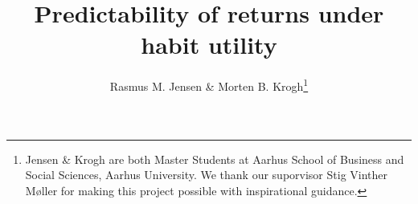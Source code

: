 

\usepackage{booktabs}



\onehalfspacing      %

\author{Rasmus M. Jensen \& Morten B. Krogh\thanks{\rm Jensen \& Krogh are both Master Students at Aarhus School of Business and Social Sciences, Aarhus University. We thank our suporvisor Stig Vinther Møller for making this project possible with inspirational guidance.}}

\title{\Large \bf Predictability of returns under habit utility}

\date{}              %


\maketitle
\thispagestyle{empty}



\clearpage


% 




\clearpage

\appendix



\clearpage


\begin{doublespacing}   %


\end{doublespacing}



\clearpage

\renewcommand{\enotesize}{\normalsize}


